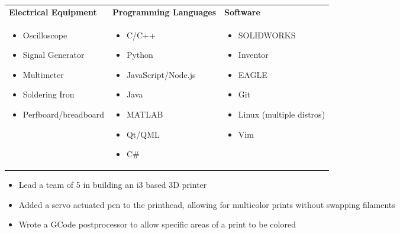 \documentclass{resume}
\author{Jasper Chan}
\begin{document}
\maketitle

\TechnicalSkills
\begin{table}[H]
	\centering
	\begin{tabularx}{\textwidth}{X X X}
		\textbf{Electrical Equipment} & \textbf{Programming Languages} & \textbf{Software} \\
		\begin{itemize}
			\item Oscilloscope
			\item Signal Generator
			\item Multimeter
			\item Soldering Iron
			\item Perfboard/breadboard
		\end{itemize} &
		\begin{itemize}
			\item C/C++
			\item Python
			\item JavaScript/Node.js
			\item Java
			\item MATLAB
			\item Qt/QML
			\item C\#
		\end{itemize} &
		\begin{itemize}
			\item SOLIDWORKS
			\item Inventor
			\item EAGLE
			\item Git
			\item Linux (multiple distros)
			\item Vim
		\end{itemize}
	\end{tabularx}
\end{table}
\vspace{-4em} %
\CoopStatus


\TechnicalProjects

\begin{itemize}
	\item Lead a team of 5 in building an i3 based 3D printer
	\item Added a servo actuated pen to the printhead, allowing for multicolor prints without swapping filaments
	\item Wrote a GCode postprocessor to allow specific areas of a print to be colored
\end{itemize}
\end{document}

